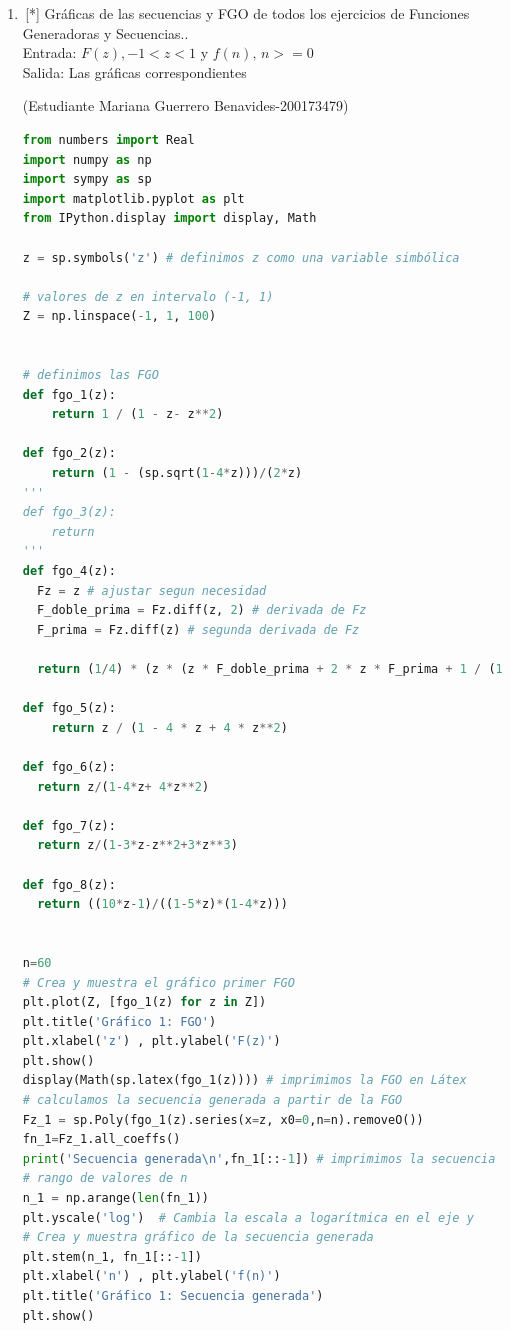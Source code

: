 \begin{enumerate}
\begin{lstlisting} [language=Python]
# imprimimos el triangulo de bell
print(f"Triangulo de Bell para 0 <= n < 10:")
for row in triangulo_bell(9):
    row_values = [str(value) for value in row if value != 0]
    print(" ".join(row_values))
print()
# imprimimos particiones correspondientes para 0 <= n < 10
for n in range(10):
    valor = triangulo_bell(n)[n][0]
    particiones = particiones_conj(n)
    print(f"B({n}) = {valor}, las particiones correspondientes son:")
    for i, particion in enumerate(particiones):
        print(f"- {particion}")
print()
    \end{lstlisting}
    \item \,[*] Gráficas de las secuencias y FGO de todos los ejercicios de Funciones Generadoras y Secuencias..\\
    Entrada: $F(z), -1 < z < 1$ y $ f(n),\, n>=0$ \\
    Salida: Las gráficas correspondientes

    \cite{secuencia_FGO}
    
    (Estudiante Mariana Guerrero Benavides-200173479)
    \begin{lstlisting}[language=Python]
    from numbers import Real
import numpy as np
import sympy as sp
import matplotlib.pyplot as plt
from IPython.display import display, Math

z = sp.symbols('z') # definimos z como una variable simbólica

# valores de z en intervalo (-1, 1)
Z = np.linspace(-1, 1, 100)


# definimos las FGO
def fgo_1(z):
    return 1 / (1 - z- z**2) 

def fgo_2(z):
    return (1 - (sp.sqrt(1-4*z)))/(2*z)  
'''
def fgo_3(z):
    return
'''
def fgo_4(z):
  Fz = z # ajustar segun necesidad
  F_doble_prima = Fz.diff(z, 2) # derivada de Fz
  F_prima = Fz.diff(z) # segunda derivada de Fz

  return (1/4) * (z * (z * F_doble_prima + 2 * z * F_prima + 1 / (1 - z)) + 3 * z * F_prima)

def fgo_5(z):
    return z / (1 - 4 * z + 4 * z**2)

def fgo_6(z):
  return z/(1-4*z+ 4*z**2)

def fgo_7(z):
  return z/(1-3*z-z**2+3*z**3)

def fgo_8(z):
  return ((10*z-1)/((1-5*z)*(1-4*z)))


n=60
# Crea y muestra el gráfico primer FGO
plt.plot(Z, [fgo_1(z) for z in Z])
plt.title('Gráfico 1: FGO')
plt.xlabel('z') , plt.ylabel('F(z)')
plt.show()
display(Math(sp.latex(fgo_1(z)))) # imprimimos la FGO en Látex
# calculamos la secuencia generada a partir de la FGO
Fz_1 = sp.Poly(fgo_1(z).series(x=z, x0=0,n=n).removeO())
fn_1=Fz_1.all_coeffs()
print('Secuencia generada\n',fn_1[::-1]) # imprimimos la secuencia generada
# rango de valores de n
n_1 = np.arange(len(fn_1))
plt.yscale('log')  # Cambia la escala a logarítmica en el eje y
# Crea y muestra gráfico de la secuencia generada
plt.stem(n_1, fn_1[::-1])
plt.xlabel('n') , plt.ylabel('f(n)')
plt.title('Gráfico 1: Secuencia generada')
plt.show()


\end{lstlisting}
\end{enumerate}
